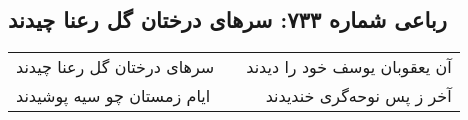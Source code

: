 \begin{center}
\section*{رباعی شماره ۷۳۳: سرهای درختان گل رعنا چیدند}
\label{sec:0733}
\begin{longtable}{l p{0.5cm} r}
سرهای درختان گل رعنا چیدند
&&
آن یعقوبان یوسف خود را دیدند
\\
ایام زمستان چو سیه پوشیدند
&&
آخر ز پس نوحه‌گری خندیدند
\\
\end{longtable}
\end{center}

